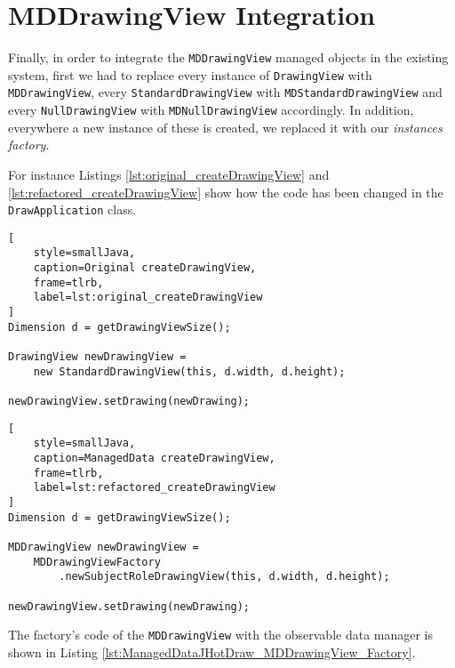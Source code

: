 \section{MDDrawingView Integration}
Finally, in order to integrate the \texttt{MDDrawingView} managed objects in the existing system, first we had to replace every instance of \texttt{DrawingView} with \texttt{MDDrawingView}, every \texttt{StandardDrawingView} with \texttt{MDStandardDrawingView} and every \texttt{NullDrawingView} with \texttt{MDNullDrawingView} accordingly.
In addition, everywhere a new instance of these is created, we replaced it with our \textit{instances factory}.

For instance Listings \ref{lst:original_createDrawingView} and \ref{lst:refactored_createDrawingView} show how the code has been changed in the \texttt{DrawApplication} class.


\noindent\begin{minipage}{.45\textwidth}
\begin{lstlisting}[
	style=smallJava,
	caption=Original createDrawingView,
	frame=tlrb,
	label=lst:original_createDrawingView
]
Dimension d = getDrawingViewSize();

DrawingView newDrawingView = 
	new StandardDrawingView(this, d.width, d.height);

newDrawingView.setDrawing(newDrawing);
\end{lstlisting}
\end{minipage}\hfill
\begin{minipage}{.47\textwidth}
\begin{lstlisting}[
	style=smallJava,
	caption=ManagedData createDrawingView,
	frame=tlrb,
	label=lst:refactored_createDrawingView
]
Dimension d = getDrawingViewSize();

MDDrawingView newDrawingView = 
	MDDrawingViewFactory
		.newSubjectRoleDrawingView(this, d.width, d.height);

newDrawingView.setDrawing(newDrawing);
	\end{lstlisting}
\label{lst:createDrawingView}
\end{minipage}

The factory's code of the \texttt{MDDrawingView} with the observable data manager is shown in Listing \ref{lst:ManagedDataJHotDraw_MDDrawingView_Factory}.

